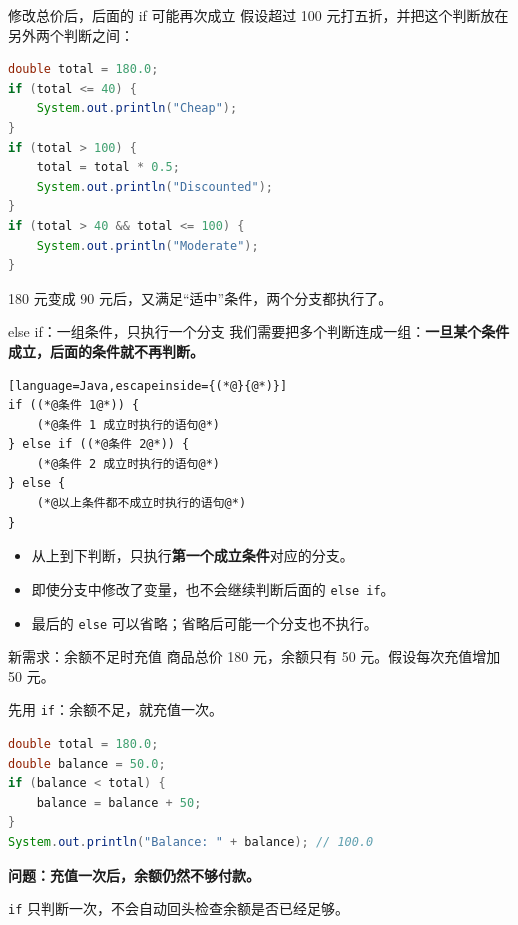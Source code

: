 \documentclass[aspectratio=169]{beamer}
\begin{document}
\begin{frame}[fragile]{修改总价后，后面的 if 可能再次成立}
  假设超过 100 元打五折，并把这个判断放在另外两个判断之间：
  \begin{lstlisting}[language=Java]
double total = 180.0;
if (total <= 40) {
    System.out.println("Cheap");
}
if (total > 100) {
    total = total * 0.5;
    System.out.println("Discounted");
}
if (total > 40 && total <= 100) {
    System.out.println("Moderate");
}
  \end{lstlisting}
  180 元变成 90 元后，又满足“适中”条件，两个分支都执行了。
\end{frame}

\begin{frame}[fragile]{else if：一组条件，只执行一个分支}
  我们需要把多个判断连成一组：\textbf{一旦某个条件成立，后面的条件就不再判断。}
  \par\medskip
  \begin{lstlisting}[language=Java,escapeinside={(*@}{@*)}]
if ((*@条件 1@*)) {
    (*@条件 1 成立时执行的语句@*)
} else if ((*@条件 2@*)) {
    (*@条件 2 成立时执行的语句@*)
} else {
    (*@以上条件都不成立时执行的语句@*)
}
  \end{lstlisting}
  \begin{itemize}
    \item 从上到下判断，只执行\textbf{第一个成立条件}对应的分支。
    \item 即使分支中修改了变量，也不会继续判断后面的 \texttt{else if}。
    \item 最后的 \texttt{else} 可以省略；省略后可能一个分支也不执行。
  \end{itemize}
\end{frame}

\begin{frame}[fragile]{新需求：余额不足时充值}
  商品总价 180 元，余额只有 50 元。假设每次充值增加 50 元。
  \par\medskip
  先用 \texttt{if}：余额不足，就充值一次。
  \begin{lstlisting}[language=Java]
double total = 180.0;
double balance = 50.0;
if (balance < total) {
    balance = balance + 50;
}
System.out.println("Balance: " + balance); // 100.0
  \end{lstlisting}
  \textbf{问题：充值一次后，余额仍然不够付款。}
  \par\medskip
  \texttt{if} 只判断一次，不会自动回头检查余额是否已经足够。
\end{frame}
\end{document}
